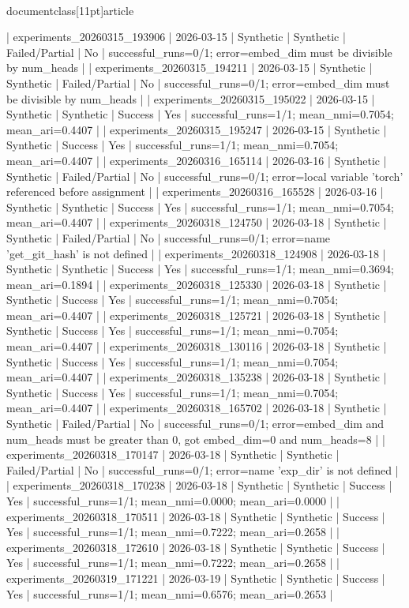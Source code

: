 \\documentclass[11pt]{article}
\begin{document}
\begin{CodeBlock}
| experiments_20260315_193906 | 2026-03-15 | Synthetic | Synthetic | Failed/Partial | No | successful_runs=0/1; error=embed_dim must be divisible by num_heads |
| experiments_20260315_194211 | 2026-03-15 | Synthetic | Synthetic | Failed/Partial | No | successful_runs=0/1; error=embed_dim must be divisible by num_heads |
| experiments_20260315_195022 | 2026-03-15 | Synthetic | Synthetic | Success | Yes | successful_runs=1/1; mean_nmi=0.7054; mean_ari=0.4407 |
| experiments_20260315_195247 | 2026-03-15 | Synthetic | Synthetic | Success | Yes | successful_runs=1/1; mean_nmi=0.7054; mean_ari=0.4407 |
| experiments_20260316_165114 | 2026-03-16 | Synthetic | Synthetic | Failed/Partial | No | successful_runs=0/1; error=local variable 'torch' referenced before assignment |
| experiments_20260316_165528 | 2026-03-16 | Synthetic | Synthetic | Success | Yes | successful_runs=1/1; mean_nmi=0.7054; mean_ari=0.4407 |
| experiments_20260318_124750 | 2026-03-18 | Synthetic | Synthetic | Failed/Partial | No | successful_runs=0/1; error=name 'get_git_hash' is not defined |
| experiments_20260318_124908 | 2026-03-18 | Synthetic | Synthetic | Success | Yes | successful_runs=1/1; mean_nmi=0.3694; mean_ari=0.1894 |
| experiments_20260318_125330 | 2026-03-18 | Synthetic | Synthetic | Success | Yes | successful_runs=1/1; mean_nmi=0.7054; mean_ari=0.4407 |
| experiments_20260318_125721 | 2026-03-18 | Synthetic | Synthetic | Success | Yes | successful_runs=1/1; mean_nmi=0.7054; mean_ari=0.4407 |
| experiments_20260318_130116 | 2026-03-18 | Synthetic | Synthetic | Success | Yes | successful_runs=1/1; mean_nmi=0.7054; mean_ari=0.4407 |
| experiments_20260318_135238 | 2026-03-18 | Synthetic | Synthetic | Success | Yes | successful_runs=1/1; mean_nmi=0.7054; mean_ari=0.4407 |
| experiments_20260318_165702 | 2026-03-18 | Synthetic | Synthetic | Failed/Partial | No | successful_runs=0/1; error=embed_dim and num_heads must be greater than 0, got embed_dim=0 and num_heads=8  |
| experiments_20260318_170147 | 2026-03-18 | Synthetic | Synthetic | Failed/Partial | No | successful_runs=0/1; error=name 'exp_dir' is not defined |
| experiments_20260318_170238 | 2026-03-18 | Synthetic | Synthetic | Success | Yes | successful_runs=1/1; mean_nmi=0.0000; mean_ari=0.0000 |
| experiments_20260318_170511 | 2026-03-18 | Synthetic | Synthetic | Success | Yes | successful_runs=1/1; mean_nmi=0.7222; mean_ari=0.2658 |
| experiments_20260318_172610 | 2026-03-18 | Synthetic | Synthetic | Success | Yes | successful_runs=1/1; mean_nmi=0.7222; mean_ari=0.2658 |
| experiments_20260319_171221 | 2026-03-19 | Synthetic | Synthetic | Success | Yes | successful_runs=1/1; mean_nmi=0.6576; mean_ari=0.2653 |

\end{CodeBlock}
\end{document}

